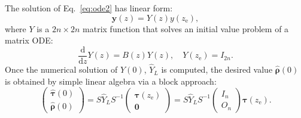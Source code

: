 \documentclass[preprint, 5p, times, sort&compress]{elsarticle}
\def\vecy{\bm{y}}
\def\vtau{\bm{\tau}}
\def\vrho{\bm{\rho}}
\def\zbot{z_\text{e}}
\def\dd{\mathrm{d}}
\def\vzero{\bm{0}}
\begin{document}
        The solution of Eq.~\eqref{eq:ode2} has linear form:
        \begin{equation}
                \vecy(z) = Y(z)y(\zbot),
        \end{equation}
        where $Y$ is a $2n\times 2n$ matrix function that solves an initial value problem of a matrix ODE:
        \begin{equation}
                \frac{\dd}{\dd z}Y(z) = B(z)Y(z), \quad Y(\zbot) = I_{2n}.
        \end{equation}
        Once the numerical solution of $Y(0)$, $\hat{Y}_L$ is computed, the desired value $\hat{\vrho}(0)$ is obtained by simple linear algebra via a block approach:
        \begin{equation}
                \begin{pmatrix}
                        \hat{\vtau}(0) \\
                        \hat{\vrho}(0)
                \end{pmatrix}
                = S\hat{Y}_LS^{-1}
                \begin{pmatrix}
                        \vtau(\zbot) \\
                        \vzero
                \end{pmatrix}
                = S\hat{Y}_LS^{-1}\begin{pmatrix}
                        I_n \\
                        O_n
                \end{pmatrix}
                \vtau(\zbot).
                \label{eq:mateq}
        \end{equation}
\end{document}
